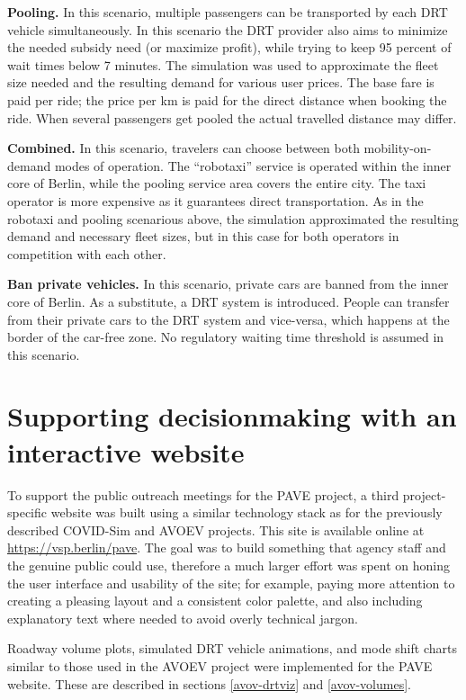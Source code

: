 \textbf{Pooling.} In this scenario, multiple passengers can be transported by each DRT vehicle simultaneously. In this scenario the DRT provider also aims to minimize the needed subsidy need (or maximize profit),  while trying to keep 95 percent of wait times below 7 minutes. The simulation was used to approximate the fleet size needed and the resulting demand for various user prices. The base fare is paid per ride; the price per km is paid for the direct distance when booking the ride. When several passengers get pooled the actual travelled distance may differ.

\textbf{Combined.} In this scenario, travelers can choose between both mobility-on-demand modes of operation. The ``robotaxi'' service is operated within the inner core of Berlin, while the pooling service area covers the entire city. The taxi operator is more expensive as it guarantees direct transportation. As in the robotaxi and pooling scenarious above, the simulation approximated the resulting demand and necessary fleet sizes, but in this case for both operators in competition with each other.

\textbf{Ban private vehicles.} In this scenario, private cars are banned from the inner core of Berlin. As a substitute, a DRT system is introduced. People can transfer from their private cars to the DRT system and vice-versa, which happens at the border of the car-free zone. No regulatory waiting time threshold is assumed in this scenario.

\section{Supporting decisionmaking with an interactive website}
\label{pave-site-features}

To support the public outreach meetings for the PAVE project, a third project-specific website was built using a similar technology stack as for the previously described COVID-Sim and AVOEV projects. This site is available online at \url{https://vsp.berlin/pave}. The goal was to build something that agency staff and the genuine public could use, therefore a much larger effort was spent on honing the user interface and usability of the site; for example, paying more attention to creating a pleasing layout and a consistent color palette, and also including explanatory text where needed to avoid overly technical jargon.

Roadway volume plots, simulated DRT vehicle animations, and mode shift charts similar to those used in the AVOEV project were implemented for the PAVE website. These are described in sections \ref{avov-drtviz} and \ref{avov-volumes}.

